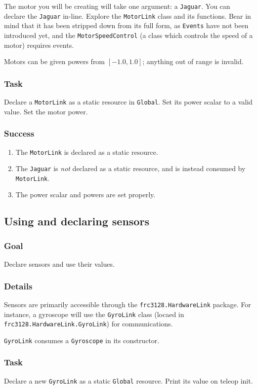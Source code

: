 \documentclass[a4paper]{article}
\begin{document}
The motor you will be creating will take one argument: a \lstinline{Jaguar}. You can declare the \lstinline{Jaguar} in-line. Explore the \lstinline{MotorLink} class and its functions. Bear in mind that it has been stripped down from its full form, as \lstinline{Events} have not been introduced yet, and the \lstinline{MotorSpeedControl} (a class which controls the speed of a motor) requires events.

Motors can be given powers from $[-1.0,1.0]$; anything out of range is invalid.
\subsubsection{Task} Declare a \lstinline{MotorLink} as a static resource in \lstinline{Global}. Set its power scalar to a valid value. Set the motor power.
\subsubsection{Success} \begin{enumerate}\item{The \lstinline{MotorLink} is declared as a static resource.}\item{The \lstinline{Jaguar} is \textit{not} declared as a static resource, and is instead consumed by \lstinline{MotorLink}.}\item{The power scalar and powers are set properly.}\end{enumerate}

\pagebreak\subsection{Using and declaring sensors}
\subsubsection{Goal} Declare sensors and use their values.
\subsubsection{Details} Sensors are primarily accessible through the \lstinline{frc3128.HardwareLink} package. For instance, a gyroscope will use the \lstinline{GyroLink} class (locaed in \lstinline{frc3128.HardwareLink.GyroLink}) for communications. 

\lstinline{GyroLink} consumes a \lstinline{Gyroscope} in its constructor.
\subsubsection{Task} Declare a new \lstinline{GyroLink} as a static \lstinline{Global} resource. Print its value on teleop init.
\end{document}
